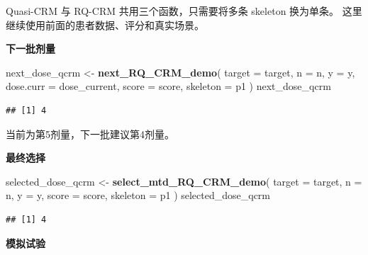 \documentclass[
  chinese,
]{article}
\newenvironment{Shaded}{\begin{snugshade}}{\end{snugshade}}
\newcommand{\AttributeTok}[1]{\textcolor[rgb]{0.13,0.29,0.53}{#1}}
\newcommand{\FunctionTok}[1]{\textcolor[rgb]{0.13,0.29,0.53}{\textbf{#1}}}
\newcommand{\NormalTok}[1]{#1}
\newcommand{\OtherTok}[1]{\textcolor[rgb]{0.56,0.35,0.01}{#1}}
\begin{document}
Quasi-CRM 与 RQ-CRM 共用三个函数，只需要将多条 skeleton 换为单条。
这里继续使用前面的患者数据、评分和真实场景。

\textbf{下一批剂量}

\begin{Shaded}
\begin{Highlighting}[]
\NormalTok{next\_dose\_qcrm }\OtherTok{\textless{}{-}} \FunctionTok{next\_RQ\_CRM\_demo}\NormalTok{(}
  \AttributeTok{target =}\NormalTok{ target, }\AttributeTok{n =}\NormalTok{ n, }\AttributeTok{y =}\NormalTok{ y, }\AttributeTok{dose.curr =}\NormalTok{ dose\_current,}
  \AttributeTok{score =}\NormalTok{ score, }\AttributeTok{skeleton =}\NormalTok{ p1}
\NormalTok{)}
\NormalTok{next\_dose\_qcrm}
\end{Highlighting}
\end{Shaded}

\begin{verbatim}
## [1] 4
\end{verbatim}

当前为第5剂量，下一批建议第4剂量。

\textbf{最终选择}

\begin{Shaded}
\begin{Highlighting}[]
\NormalTok{selected\_dose\_qcrm }\OtherTok{\textless{}{-}} \FunctionTok{select\_mtd\_RQ\_CRM\_demo}\NormalTok{(}
  \AttributeTok{target =}\NormalTok{ target, }\AttributeTok{n =}\NormalTok{ n, }\AttributeTok{y =}\NormalTok{ y, }\AttributeTok{score =}\NormalTok{ score, }\AttributeTok{skeleton =}\NormalTok{ p1}
\NormalTok{)}
\NormalTok{selected\_dose\_qcrm}
\end{Highlighting}
\end{Shaded}

\begin{verbatim}
## [1] 4
\end{verbatim}

\textbf{模拟试验}
\end{document}
